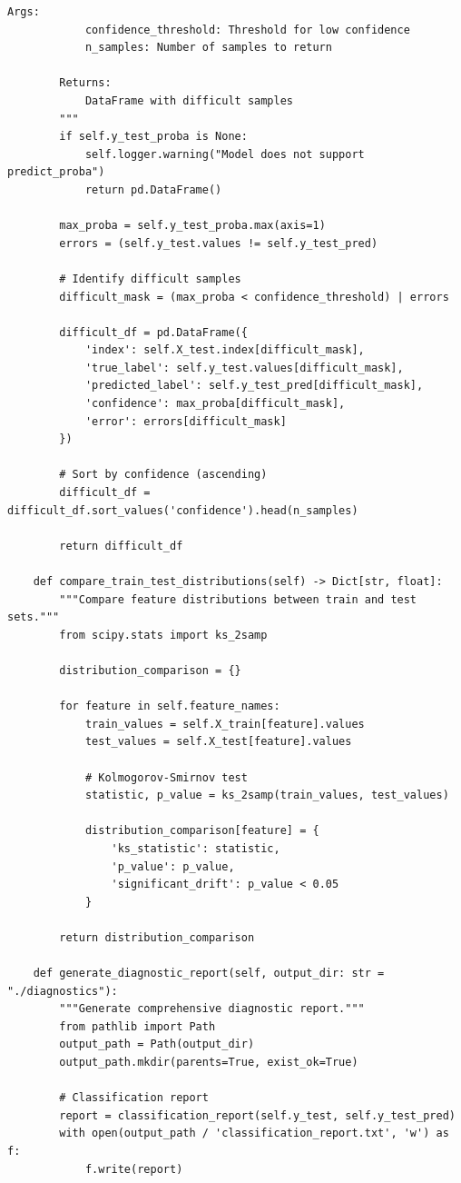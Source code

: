 \begin{lstlisting}[style=python, caption={Comprehensive Model Diagnostic Tools}]
        Args:
            confidence_threshold: Threshold for low confidence
            n_samples: Number of samples to return

        Returns:
            DataFrame with difficult samples
        """
        if self.y_test_proba is None:
            self.logger.warning("Model does not support predict_proba")
            return pd.DataFrame()

        max_proba = self.y_test_proba.max(axis=1)
        errors = (self.y_test.values != self.y_test_pred)

        # Identify difficult samples
        difficult_mask = (max_proba < confidence_threshold) | errors

        difficult_df = pd.DataFrame({
            'index': self.X_test.index[difficult_mask],
            'true_label': self.y_test.values[difficult_mask],
            'predicted_label': self.y_test_pred[difficult_mask],
            'confidence': max_proba[difficult_mask],
            'error': errors[difficult_mask]
        })

        # Sort by confidence (ascending)
        difficult_df = difficult_df.sort_values('confidence').head(n_samples)

        return difficult_df

    def compare_train_test_distributions(self) -> Dict[str, float]:
        """Compare feature distributions between train and test sets."""
        from scipy.stats import ks_2samp

        distribution_comparison = {}

        for feature in self.feature_names:
            train_values = self.X_train[feature].values
            test_values = self.X_test[feature].values

            # Kolmogorov-Smirnov test
            statistic, p_value = ks_2samp(train_values, test_values)

            distribution_comparison[feature] = {
                'ks_statistic': statistic,
                'p_value': p_value,
                'significant_drift': p_value < 0.05
            }

        return distribution_comparison

    def generate_diagnostic_report(self, output_dir: str = "./diagnostics"):
        """Generate comprehensive diagnostic report."""
        from pathlib import Path
        output_path = Path(output_dir)
        output_path.mkdir(parents=True, exist_ok=True)

        # Classification report
        report = classification_report(self.y_test, self.y_test_pred)
        with open(output_path / 'classification_report.txt', 'w') as f:
            f.write(report)


\end{lstlisting}
